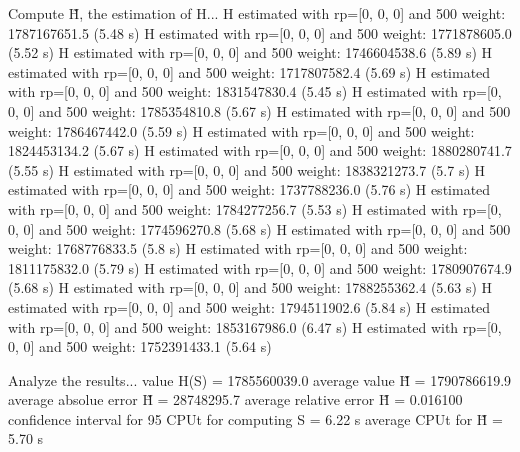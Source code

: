Compute H̃, the estimation of H...
  H estimated with rp=[0, 0, 0] and 500 weight:  1787167651.5  (5.48 s)
  H estimated with rp=[0, 0, 0] and 500 weight:  1771878605.0  (5.52 s)
  H estimated with rp=[0, 0, 0] and 500 weight:  1746604538.6  (5.89 s)
  H estimated with rp=[0, 0, 0] and 500 weight:  1717807582.4  (5.69 s)
  H estimated with rp=[0, 0, 0] and 500 weight:  1831547830.4  (5.45 s)
  H estimated with rp=[0, 0, 0] and 500 weight:  1785354810.8  (5.67 s)
  H estimated with rp=[0, 0, 0] and 500 weight:  1786467442.0  (5.59 s)
  H estimated with rp=[0, 0, 0] and 500 weight:  1824453134.2  (5.67 s)
  H estimated with rp=[0, 0, 0] and 500 weight:  1880280741.7  (5.55 s)
  H estimated with rp=[0, 0, 0] and 500 weight:  1838321273.7  (5.7 s)
  H estimated with rp=[0, 0, 0] and 500 weight:  1737788236.0  (5.76 s)
  H estimated with rp=[0, 0, 0] and 500 weight:  1784277256.7  (5.53 s)
  H estimated with rp=[0, 0, 0] and 500 weight:  1774596270.8  (5.68 s)
  H estimated with rp=[0, 0, 0] and 500 weight:  1768776833.5  (5.8 s)
  H estimated with rp=[0, 0, 0] and 500 weight:  1811175832.0  (5.79 s)
  H estimated with rp=[0, 0, 0] and 500 weight:  1780907674.9  (5.68 s)
  H estimated with rp=[0, 0, 0] and 500 weight:  1788255362.4  (5.63 s)
  H estimated with rp=[0, 0, 0] and 500 weight:  1794511902.6  (5.84 s)
  H estimated with rp=[0, 0, 0] and 500 weight:  1853167986.0  (6.47 s)
  H estimated with rp=[0, 0, 0] and 500 weight:  1752391433.1  (5.64 s)

Analyze the results...
  value H(S)                  = 1785560039.0 
  average value H̃             = 1790786619.9 
  average absolue error H̃     = 28748295.7 
  average relative error H̃    = 0.016100 
  confidence interval for 95%
  CPUt for computing S         = 6.22 s
  average CPUt for H̃           = 5.70 s

